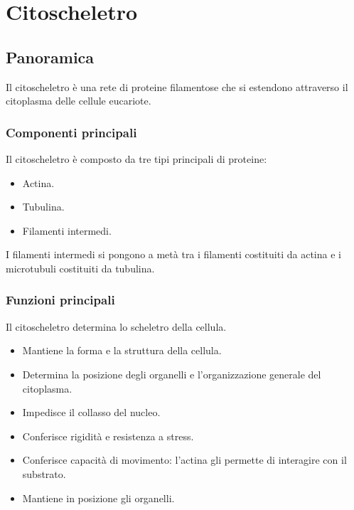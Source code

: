 \chapter{Citoscheletro}

\section{Panoramica}
Il citoscheletro \`e una rete di proteine filamentose che si estendono attraverso il citoplasma delle cellule eucariote.

	\subsection{Componenti principali}
	Il citoscheletro \`e composto da tre tipi principali di proteine:
	\begin{multicols}{3}
		\begin{itemize}
			\item Actina.
			\item Tubulina.
			\item Filamenti intermedi.
		\end{itemize}
	\end{multicols}
	I filamenti intermedi si pongono a met\`a tra i filamenti costituiti da actina e i microtubuli costituiti da tubulina.

	\subsection{Funzioni principali}
	Il citoscheletro determina lo scheletro della cellula.
	\begin{multicols}{2}
		\begin{itemize}
			\item Mantiene la forma e la struttura della cellula.
			\item Determina la posizione degli organelli e l'organizzazione generale del citoplasma.
			\item Impedisce il collasso del nucleo.
			\item Conferisce rigidit\`a e resistenza a stress.
			\item Conferisce capacit\`a di movimento: l'actina gli permette di interagire con il substrato.
			\item Mantiene in posizione gli organelli.
		\end{itemize}
	\end{multicols}

